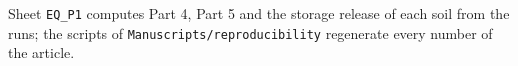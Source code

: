 Sheet \texttt{EQ\_P1} computes Part 4, Part 5 and the storage release of each soil from the runs; the scripts of \nolinkurl{Manuscripts/reproducibility} regenerate every number of the article.
